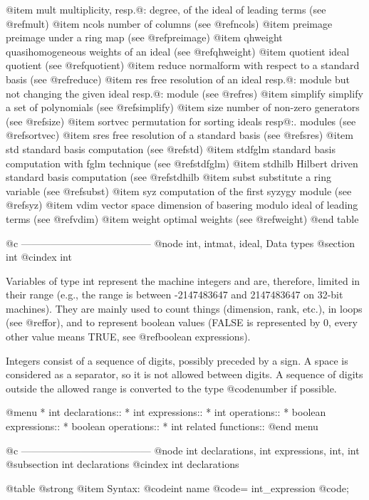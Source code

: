 @item mult
multiplicity, resp.@: degree, of the ideal of leading terms (see @ref{mult})
@item ncols
number of columns (see @ref{ncols})
@item preimage
preimage under a ring map (see @ref{preimage})
@item qhweight
quasihomogeneous weights of an ideal (see @ref{qhweight})
@item quotient
ideal quotient (see @ref{quotient})
@item reduce
normalform with respect to a standard basis (see @ref{reduce})
@item res
free resolution of an ideal resp.@: module but not changing the given ideal resp.@: module
(see @ref{res})
@item simplify
simplify a set of polynomials (see @ref{simplify})
@item size
number of non-zero generators (see @ref{size})
@item sortvec
permutation for sorting ideals resp@:. modules (see @ref{sortvec})
@item sres
free resolution of a standard basis (see @ref{sres})
@item std
standard basis computation (see @ref{std})
@item stdfglm
standard basis computation with fglm technique (see @ref{stdfglm})
@item stdhilb
Hilbert driven standard basis computation (see @ref{stdhilb}
@item subst
substitute a ring variable (see @ref{subst})
@item syz
computation of the first syzygy module (see @ref{syz})
@item vdim
vector space dimension of basering modulo ideal of leading terms
(see @ref{vdim})
@item weight
optimal weights (see @ref{weight})
@end table

@c ---------------------------------------
@node int, intmat, ideal, Data types
@section int
@cindex int

Variables of type int represent the machine integers and are, therefore,
limited  in their range (e.g., the range is between
-2147483647 and 2147483647 on 32-bit machines). They are mainly used
to count things (dimension, rank, etc.),
in loops (see @ref{for}), and
to represent boolean values
(FALSE is represented by 0, every other value means TRUE, see
@ref{boolean expressions}).

Integers consist of a sequence of digits, possibly preceded by a sign.
A space is considered as a separator, so it is not allowed between digits.
A sequence of digits outside the allowed range is converted to the type
@code{number} if possible.

@menu
* int declarations::
* int expressions::
* int operations::
* boolean expressions::
* boolean operations::
* int related functions::
@end menu

@c ---------------------------------------
@node int declarations, int expressions, int, int
@subsection int declarations
@cindex int declarations

@table @strong
@item Syntax:
@code{int} name @code{=} int_expression @code{;}

